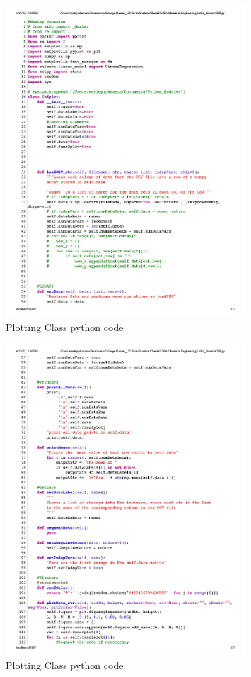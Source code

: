 \documentclass{article}
\begin{document}
\begin{figure}[H] \centering
\includegraphics[width=0.8\textwidth]{code/che_py1024_1.jpg}
\caption{\label{fig1}Plotting Class python code}\end{figure}


\begin{figure}[H] \centering
\includegraphics[width=0.8\textwidth]{code/che_py1024_2.jpg}
\caption{\label{fig1}Plotting Class python code}\end{figure}
\end{document}
